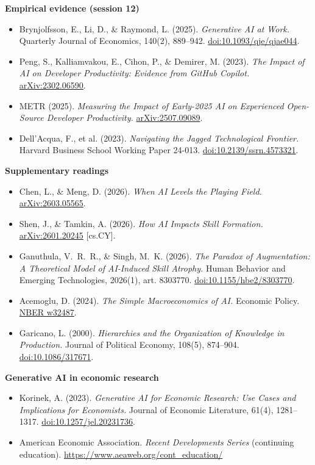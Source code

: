 \documentclass[11pt]{article}
\begin{document}
\textbf{Empirical evidence (session 12)}
\begin{itemize}
\item Brynjolfsson, E., Li, D., \& Raymond, L. (2025). \emph{Generative AI at Work.} Quarterly Journal of Economics, 140(2), 889--942. \href{https://doi.org/10.1093/qje/qjae044}{doi:10.1093/qje/qjae044}.
\item Peng, S., Kalliamvakou, E., Cihon, P., \& Demirer, M. (2023). \emph{The Impact of AI on Developer Productivity: Evidence from GitHub Copilot.} \href{https://arxiv.org/abs/2302.06590}{arXiv:2302.06590}.
\item METR (2025). \emph{Measuring the Impact of Early-2025 AI on Experienced Open-Source Developer Productivity.} \href{https://arxiv.org/abs/2507.09089}{arXiv:2507.09089}.
\item Dell'Acqua, F., et al. (2023). \emph{Navigating the Jagged Technological Frontier.} Harvard Business School Working Paper 24-013. \href{https://doi.org/10.2139/ssrn.4573321}{doi:10.2139/ssrn.4573321}.
\end{itemize}

\textbf{Supplementary readings}
\begin{itemize}
\item Chen, L., \& Meng, D. (2026). \emph{When AI Levels the Playing Field.} \href{https://arxiv.org/abs/2603.05565}{arXiv:2603.05565}.
\item Shen, J., \& Tamkin, A. (2026). \emph{How AI Impacts Skill Formation.} \href{https://arxiv.org/abs/2601.20245}{arXiv:2601.20245} [cs.CY].
\item Ganuthula, V.~R.~R., \& Singh, M.~K. (2026). \emph{The Paradox of Augmentation: A Theoretical Model of AI-Induced Skill Atrophy.} Human Behavior and Emerging Technologies, 2026(1), art. 8303770. \href{https://doi.org/10.1155/hbe2/8303770}{doi:10.1155/hbe2/8303770}.
\item Acemoglu, D. (2024). \emph{The Simple Macroeconomics of AI.} Economic Policy. \href{https://www.nber.org/papers/w32487}{NBER w32487}.
\item Garicano, L. (2000). \emph{Hierarchies and the Organization of Knowledge in Production.} Journal of Political Economy, 108(5), 874--904. \href{https://doi.org/10.1086/317671}{doi:10.1086/317671}.
\end{itemize}

\textbf{Generative AI in economic research}
\begin{itemize}
\item Korinek, A. (2023). \emph{Generative AI for Economic Research: Use Cases and Implications for Economists.} Journal of Economic Literature, 61(4), 1281--1317. \href{https://doi.org/10.1257/jel.20231736}{doi:10.1257/jel.20231736}.
\item American Economic Association. \emph{Recent Developments Series} (continuing education). \url{https://www.aeaweb.org/cont_education/}
\end{itemize}
\end{document}
